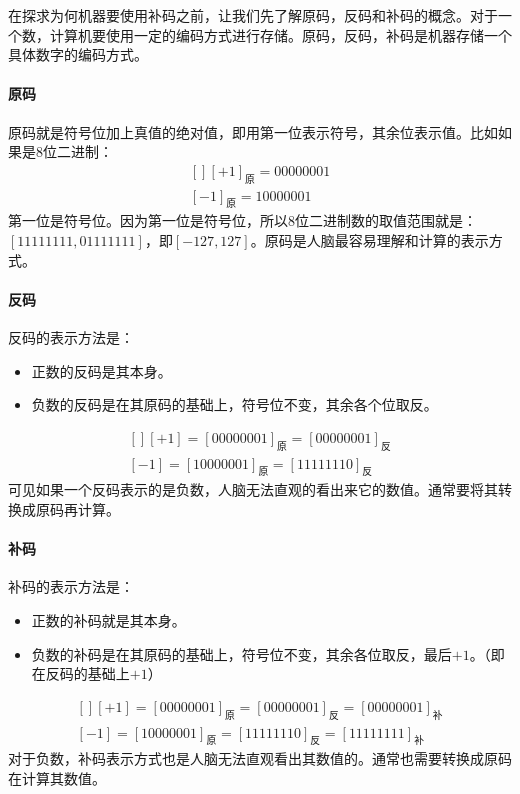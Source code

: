 在探求为何机器要使用补码之前，让我们先了解原码，反码和补码的概念。对于一个数，计算机要使用一定的编码方式进行存储。原码，反码，补码是机器存储一个具体数字的编码方式。

\paragraph*{原码}
原码就是符号位加上真值的绝对值，即用第一位表示符号，其余位表示值。比如如果是8位二进制：
$$\begin{aligned}[]
[+1]_{\textrm{原}}=00000001\\
[-1]_{\textrm{原}}=10000001
\end{aligned}$$
第一位是符号位。因为第一位是符号位，所以8位二进制数的取值范围就是：$[11111111,01111111]$，即$[-127,127]$。原码是人脑最容易理解和计算的表示方式。

\paragraph*{反码}
反码的表示方法是：
\begin{itemize}
\item 正数的反码是其本身。
\item 负数的反码是在其原码的基础上，符号位不变，其余各个位取反。
\end{itemize}
$$\begin{aligned}[]
[+1]=[00000001]_{\textrm{原}}=[00000001]_{\textrm{反}}\\
[-1]=[10000001]_{\textrm{原}}=[11111110]_{\textrm{反}}
\end{aligned}$$
可见如果一个反码表示的是负数，人脑无法直观的看出来它的数值。通常要将其转换成原码再计算。

\paragraph*{补码}
补码的表示方法是：
\begin{itemize}
\item 正数的补码就是其本身。
\item 负数的补码是在其原码的基础上，符号位不变，其余各位取反，最后$+1$。（即在反码的基础上$+1$）
\end{itemize}
$$\begin{aligned}[]
[+1]=[00000001]_{\textrm{原}}=[00000001]_{\textrm{反}}=[00000001]_{\textrm{补}}\\
[-1]=[10000001]_{\textrm{原}}=[11111110]_{\textrm{反}}=[11111111]_{\textrm{补}}
\end{aligned}$$
对于负数，补码表示方式也是人脑无法直观看出其数值的。通常也需要转换成原码在计算其数值。

